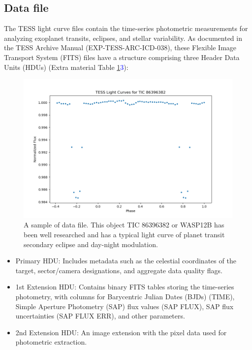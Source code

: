 \documentclass{article}
\begin{document}
\subsection{Data file}

The TESS light curve files contain the time-series photometric measurements for analyzing exoplanet transits, eclipses, and stellar variability. As documented in the TESS Archive Manual (EXP-TESS-ARC-ICD-038), these Flexible Image Transport System (FITS) files have a structure comprising three Header Data Units (HDUs) (Extra material Table \hyperref[fig:table13]1\textcolor{blue}{3}):

\begin{figure}[H]
    \centering
    \includegraphics[width=1\linewidth]{image/86396382_folded.png}
    \captionsetup{font=small} 
    \caption{A sample of data file. This object TIC 86396382 or WASP12B has been well researched and has a typical light curve of planet transit secondary eclipse and day-night modulation.}
    \label{fig:wasp12b}
\end{figure}

\begin{itemize}

    \item Primary HDU: Includes metadata such as the celestial coordinates of the target, sector/camera designations, and aggregate data quality flags.

    \item 1st Extension HDU: Contains binary FITS tables storing the time-series photometry, with columns for Barycentric Julian Dates (BJDs) (TIME), Simple Aperture Photometry (SAP) flux values (SAP FLUX), SAP flux uncertainties (SAP FLUX ERR), and other parameters.

    \item 2nd Extension HDU: An image extension with the pixel data used for photometric extraction.
    
\end{itemize}
\end{document}
